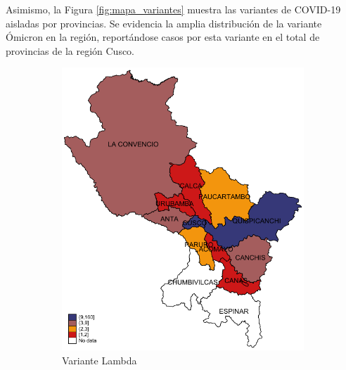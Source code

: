 \documentclass[12pt,a4paper,openany]{book}
\begin{document}
	Asimismo, la Figura \ref{fig:mapa_variantes} muestra las variantes de COVID-19 aisladas por provincias. Se evidencia la amplia distribución de la variante Ómicron en la región, reportándose casos por esta variante en el total de provincias de la región Cusco.
	
	\begin{figure}[h]
		\caption{Distribución provincial de las variantes de SARS-CoV-2 aisladas en la Región Cusco hasta la SE 34-2022.}
		\label{fig:mapa_variantes}
		\centering
		\begin{subfigure}[b]{0.40\textwidth}
			\centering
			\includegraphics[width=\textwidth]{../figuras/variantes_provincial_lambda.pdf}
			\caption{Variante Lambda}
		\end{subfigure}
		\hfill
		\begin{subfigure}[b]{0.40\textwidth}
			\centering

\end{subfigure}
\end{figure}
\end{document}
